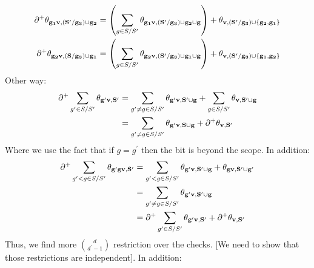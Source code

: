 {\begin{equation*}
\begin{split}
    \end{split}
  \end{equation*}
  \begin{equation*}
    \begin{split}
      \partial^{+} \mathbf{\theta_{g_{1}v ,(S^{\prime}/ g_{3}) \cup g_{2} } } &= \left(\sum_{g\in S/S^{\prime}} \mathbf{\theta_{g_{1}v ,(S^{\prime}/ g_{3}) \cup g_{2}   \cup g } } \right) +  \mathbf{\theta_{v ,(S^{\prime}/ g_{3}) \cup \{ g_{2}, g_{1} \} } }  \\
    \partial^{+} \mathbf{\theta_{g_{2}v ,(S / g_{3}) \cup g_{1}} } &= \left( \sum_{g\in S/S^{\prime}} \mathbf{\theta_{g_{2}v ,(S^{\prime}/ g_{3}) \cup g_{1}   \cup g } } \right) + \mathbf{\theta_{v ,(S^{\prime}/ g_{3}) \cup \{g_{1},g_{2}\} } }  \\
    \end{split}
  \end{equation*}
  Other way: 
  \begin{equation*}
    \begin{split}
      \partial^{+} \sum_{g^{\prime} \in S/S^{\prime}}\mathbf{\theta_{g^{\prime}v ,S^{\prime}} } &= \sum_{g^{\prime} \neq g \in S/S^{\prime}}\mathbf{\theta_{g^{\prime}v ,S^{\prime}\cup g} } + \sum_{g \in S/S^{\prime}}\mathbf{\theta_{v ,S^{\prime} \cup g} } \\
      &= \sum_{g^{\prime} \neq g \in S/S^{\prime}}\mathbf{\theta_{g^{\prime}v ,S\cup g} } + \partial^{+}\mathbf{\theta_{v ,S^{\prime}} } 
    \end{split}
  \end{equation*}
  Where we use the fact that if $g = g^{\prime}$ then the bit is beyond the scope. In addition: 
  \begin{equation*}
    \begin{split}
      \partial^{+} \sum_{g^{\prime} < g \in S/S^{\prime}}\mathbf{\theta_{g^{\prime}gv ,S^{\prime}} } &=\sum_{g^{\prime} < g \in S/S^{\prime}}\mathbf{\theta_{g^{\prime}v ,S^{\prime} \cup g} } + \mathbf{\theta_{gv ,S^{\prime} \cup g^{\prime}} } \\
      &= \sum_{g^{\prime} \neq g \in S/S^{\prime}}\mathbf{\theta_{g^{\prime}v ,S^{\prime} \cup g} } \\
      &=  \partial^{+} \sum_{g^{\prime} \in S/S^{\prime}}\mathbf{\theta_{g^{\prime}v ,S^{\prime}} } + \partial^{+}\mathbf{\theta_{v ,S^{\prime}} } 
    \end{split}
  \end{equation*}
  Thus, we find more ${ d \choose d^{\prime} - 1 }$ restriction over the checks. [We need to show that those restrictions are independent]. In addition:
  \begin{equation*}
    \begin{split}

\end{split}
\end{equation*}}
